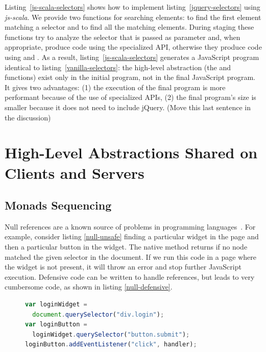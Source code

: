 \documentclass[preprint]{sigplanconf}
\begin{document}
Listing~\ref{js-scala-selectors} shows how to implement listing~\ref{jquery-selectors} using \emph{js-scala}. We
provide two functions for searching elements:  to find the first element matching a selector and
 to find all the matching elements. During staging these functions try to analyze the selector that is
passed as parameter and, when appropriate, produce code using the specialized API, otherwise they produce code using
 and . As a result, listing~\ref{js-scala-selectors} generates a
JavaScript program identical to listing~\ref{vanilla-selectors}: the high-level abstraction (the  and
 functions) exist only in the initial program, not in the final JavaScript program. It gives two
advantages: (1) the execution of the final program is more performant because of the use of specialized APIs, (2) the
final program’s size is smaller because it does not need to include jQuery. (Move this last sentence in the
discussion)


\section{High-Level Abstractions Shared on Clients and Servers}
\label{contribution-shared}

\subsection{Monads Sequencing}

Null references are a known source of problems in programming languages~\cite{Hoare09_Null,Nanda09_Null}. For
example, consider listing \ref{null-unsafe} finding a particular widget in the page and then a particular
button in the widget. The native  method returns  if no node matched the given
selector in the document. If we run this code in a page where the widget is not present, it will throw an error
and stop further JavaScript execution. Defensive code can be written to handle  references, but leads to
very cumbersome code, as shown in listing \ref{null-defensive}.

\begin{figure}
\begin{lstlisting}[language=JavaScript,label=null-unsafe,caption=Unsafe code]
var loginWidget =
  document.querySelector("div.login");
var loginButton =
  loginWidget.querySelector("button.submit");
loginButton.addEventListener("click", handler);
\end{lstlisting}
\end{figure}
\end{document}
